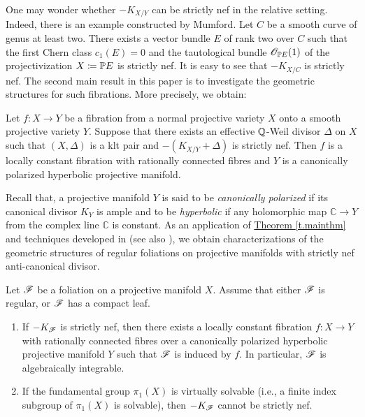 \noindent One may wonder whether $-K_{X/Y}$ can be strictly nef in the relative setting.  Indeed, there is  an example constructed by  Mumford.  Let $C$ be a smooth  curve of genus at least two. 
There exists a vector bundle $E$ of rank two over $C$ such that the first Chern class $c_1(E)=0$ and the tautological bundle $\mathscr O_{\mathbb P E}(1)$ of the projectivization $X\coloneqq \mathbb P E$ is strictly nef. It is easy to see that $-K_{X/C}$ is strictly nef.
The second main result in this paper is to investigate the geometric structures for such fibrations.
More precisely, we obtain:

\begin{mainthm}\label{t.mainthm}
	Let $f:X\rightarrow Y$ be a fibration from a normal projective variety $X$ onto a smooth projective variety $Y$. Suppose that there exists an effective $\mathbb Q$-Weil divisor $\Delta$ on $X$ such that $(X,\Delta)$ is a klt pair and $-(K_{X/Y}+\Delta)$ is strictly nef. 
	Then $f$ is a locally constant fibration with rationally connected fibres and $Y$ is a canonically polarized hyperbolic projective manifold.
\end{mainthm}

Recall that, a projective manifold $Y$ is said to be \textit{canonically polarized} if its canonical divisor $K_Y$ is ample and to be \textit{hyperbolic} if any holomorphic map $\mathbb{C}\to Y$ from the complex line $\mathbb{C}$ is constant. 
As an application of {\hyperref[t.mainthm]{Theorem \ref*{t.mainthm}}} and techniques developed in \cite{Ou21} (see also \cite[Theorem 1.1]{Druel17}), we obtain characterizations of the geometric structures of regular foliations on projective manifolds with strictly nef anti-canonical divisor. 

\begin{maincor}
	\label{c.algebraicallyintegrable}
	Let $\mathscr F$ be a foliation on a projective manifold $X$. Assume that either $\mathscr F$ is regular, or $\mathscr F$ has a compact leaf. 
	
	\begin{enumerate}
		\item[\rm(1)] If $-K_{\mathscr F}$ is strictly nef, then there exists a locally constant fibration $f:X\rightarrow Y$ with rationally connected fibres over a canonically polarized hyperbolic projective manifold $Y$ such that $\mathscr F$ is induced by $f$. In particular, $\mathscr F$ is algebraically integrable.
		
		\item[\rm(2)] If the fundamental group $\pi_1(X)$ is virtually solvable (i.e., a finite index subgroup of $\pi_1(X)$ is solvable), then $-K_{\mathscr F}$ cannot be strictly nef.
	\end{enumerate}	
\end{maincor}








